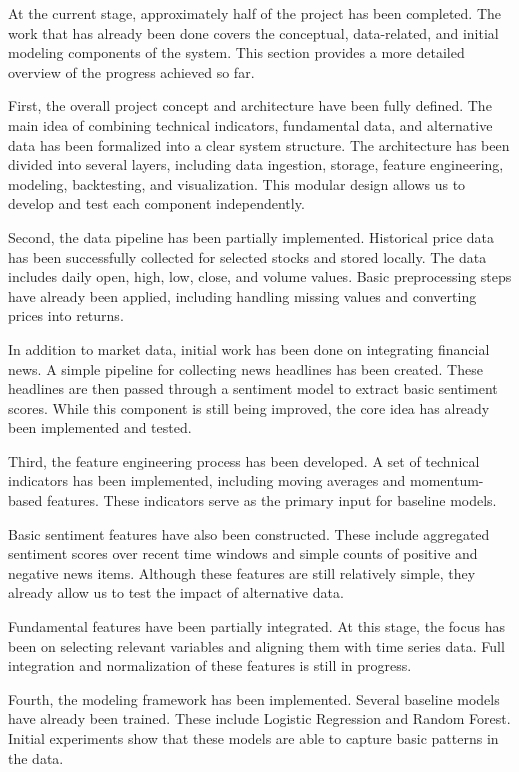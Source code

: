 \documentclass[12pt,a4paper]{article}
\begin{document}
At the current stage, approximately half of the project has been completed. The work that has already been done covers the conceptual, data-related, and initial modeling components of the system. This section provides a more detailed overview of the progress achieved so far.

First, the overall project concept and architecture have been fully defined. The main idea of combining technical indicators, fundamental data, and alternative data has been formalized into a clear system structure. The architecture has been divided into several layers, including data ingestion, storage, feature engineering, modeling, backtesting, and visualization. This modular design allows us to develop and test each component independently.

Second, the data pipeline has been partially implemented. Historical price data has been successfully collected for selected stocks and stored locally. The data includes daily open, high, low, close, and volume values. Basic preprocessing steps have already been applied, including handling missing values and converting prices into returns.

In addition to market data, initial work has been done on integrating financial news. A simple pipeline for collecting news headlines has been created. These headlines are then passed through a sentiment model to extract basic sentiment scores. While this component is still being improved, the core idea has already been implemented and tested.

Third, the feature engineering process has been developed. A set of technical indicators has been implemented, including moving averages and momentum-based features. These indicators serve as the primary input for baseline models.

Basic sentiment features have also been constructed. These include aggregated sentiment scores over recent time windows and simple counts of positive and negative news items. Although these features are still relatively simple, they already allow us to test the impact of alternative data.

Fundamental features have been partially integrated. At this stage, the focus has been on selecting relevant variables and aligning them with time series data. Full integration and normalization of these features is still in progress.

Fourth, the modeling framework has been implemented. Several baseline models have already been trained. These include Logistic Regression and Random Forest. Initial experiments show that these models are able to capture basic patterns in the data.
\end{document}
